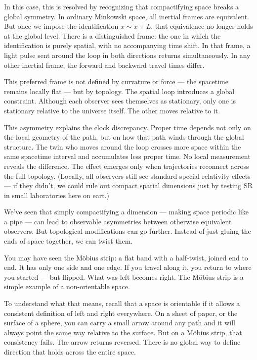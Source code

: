 In this case, this is resolved by recognizing that compactifying space breaks a global symmetry. In ordinary Minkowski space, all inertial frames are equivalent. But once we impose the identification $x \sim x + L$, that equivalence no longer holds at the global level. There is a distinguished frame: the one in which the identification is purely spatial, with no accompanying time shift. In that frame, a light pulse sent around the loop in both directions returns simultaneously. In any other inertial frame, the forward and backward travel times differ.

This preferred frame is not defined by curvature or force — the spacetime remains locally flat — but by topology. The spatial loop introduces a global constraint. Although each observer sees themselves as stationary, only one is stationary relative to the universe itself. The other moves relative to it.

This asymmetry explains the clock discrepancy. Proper time depends not only on the local geometry of the path, but on how that path winds through the global structure. The twin who moves around the loop crosses more space within the same spacetime interval and accumulates less proper time. No local measurement reveals the difference. The effect emerges only when trajectories reconnect across the full topology. (Locally, all observers still see standard special relativity effects — if they didn’t, we could rule out compact spatial dimensions just by testing SR in small laboratories here on eart.)

We’ve seen that simply compactifying a dimension — making space periodic like a pipe — can lead to observable asymmetries between otherwise equivalent observers. But topological modifications can go further. Instead of just gluing the ends of space together, we can twist them.

You may have seen the Möbius strip: a flat band with a half-twist, joined end to end. It has only one side and one edge. If you travel along it, you return to where you started — but flipped. What was left becomes right. The Möbius strip is a simple example of a non-orientable space.

To understand what that means, recall that a space is orientable if it allows a consistent definition of left and right everywhere. On a sheet of paper, or the surface of a sphere, you can carry a small arrow around any path and it will always point the same way relative to the surface. But on a Möbius strip, that consistency fails. The arrow returns reversed. There is no global way to define direction that holds across the entire space.

